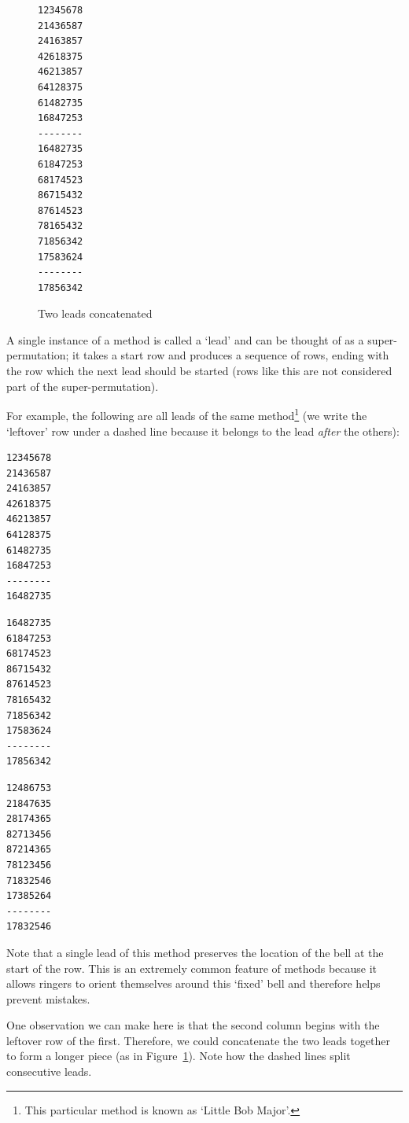 \documentclass[12pt]{article}
\begin{document}
\begin{figure}
\centering
\begin{BVerbatim}
12345678
21436587
24163857
42618375
46213857
64128375
61482735
16847253
--------
16482735
61847253
68174523
86715432
87614523
78165432
71856342
17583624
--------
17856342
\end{BVerbatim}
\caption{Two leads concatenated}\label{fig:two-leads-lb8}
\end{figure}

A single instance of a method is called a `lead' and can be thought of as a super-permutation; it
takes a start row and produces a sequence of rows, ending with the row which the next lead should be
started (rows like this are not considered part of the super-permutation).

For example, the following are all leads of the same method\footnote{This particular method is known
as `Little Bob Major'.} (we write the `leftover' row under a dashed line because it belongs to the
lead \emph{after} the others):

\begin{multicols}{3}

\centering
\begin{BVerbatim}
12345678
21436587
24163857
42618375
46213857
64128375
61482735
16847253
--------
16482735
\end{BVerbatim}

\centering
\begin{BVerbatim}
16482735
61847253
68174523
86715432
87614523
78165432
71856342
17583624
--------
17856342
\end{BVerbatim}

\centering
\begin{BVerbatim}
12486753
21847635
28174365
82713456
87214365
78123456
71832546
17385264
--------
17832546
\end{BVerbatim}

\end{multicols}

Note that a single lead of this method preserves the location of the bell at the start of the
row.  This is an extremely common feature of methods because it allows ringers to orient
themselves around this `fixed' bell and therefore helps prevent mistakes.

One observation we can make here is that the second column begins with the leftover row of the
first.  Therefore, we could concatenate the two leads together to form a longer piece (as in
Figure~\ref{fig:two-leads-lb8}). Note how the dashed lines split consecutive leads.
\end{document}
